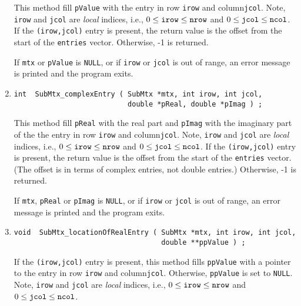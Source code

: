 \begin{enumerate}
This method fill {\tt *pValue} with the entry 
in row {\tt irow} and column{\tt jcol}.
Note, {\tt irow} and {\tt jcol} are {\it local} indices,
i.e., $0 \le \mbox{\tt irow} \le \mbox{\tt nrow}$
and $0 \le \mbox{\tt jcol} \le \mbox{\tt ncol}$.
If the {\tt (irow,jcol)} entry is present,
the return value is the offset from the start of the
{\tt entries} vector. 
Otherwise, -1 is returned.
\par {}
If {\tt mtx} or {\tt pValue} is {\tt NULL},
or if {\tt irow} or {\tt jcol} is out of range,
an error message is printed and the program exits.
\item
\begin{verbatim}
int  SubMtx_complexEntry ( SubMtx *mtx, int irow, int jcol, 
                           double *pReal, double *pImag ) ;
\end{verbatim}
This method fill {\tt *pReal} with the real part and
{\tt *pImag} with the imaginary part of the the entry 
in row {\tt irow} and column{\tt jcol}.
Note, {\tt irow} and {\tt jcol} are {\it local} indices,
i.e., $0 \le \mbox{\tt irow} \le \mbox{\tt nrow}$
and $0 \le \mbox{\tt jcol} \le \mbox{\tt ncol}$.
If the {\tt (irow,jcol)} entry is present,
the return value is the offset from the start of the
{\tt entries} vector. (The offset is in terms of complex entries,
not double entries.) Otherwise, -1 is returned.
\par {}
If {\tt mtx}, {\tt pReal} or {\tt pImag} is {\tt NULL},
or if {\tt irow} or {\tt jcol} is out of range,
an error message is printed and the program exits.
\item
\begin{verbatim}
void  SubMtx_locationOfRealEntry ( SubMtx *mtx, int irow, int jcol, 
                                   double **ppValue ) ;
\end{verbatim}
If the {\tt (irow,jcol)} entry is present,
this method fills {\tt *ppValue} with a pointer to the entry 
in row {\tt irow} and column{\tt jcol}.
Otherwise, {\tt *ppValue} is set to {\tt NULL}.
Note, {\tt irow} and {\tt jcol} are {\it local} indices,
i.e., $0 \le \mbox{\tt irow} \le \mbox{\tt nrow}$
and $0 \le \mbox{\tt jcol} \le \mbox{\tt ncol}$.
\par {}

\end{enumerate}

